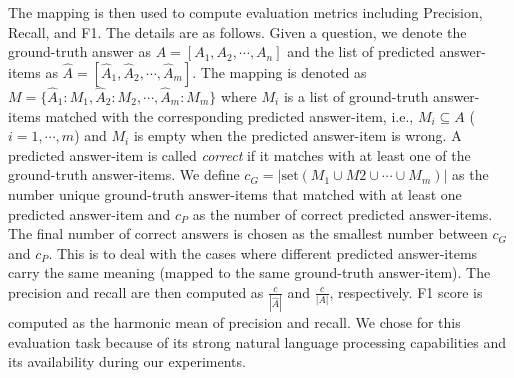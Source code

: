 The mapping is then used to compute evaluation metrics including Precision, Recall, and F1. The details are as follows. 
Given a question, we denote the ground-truth answer as $A=[A_1, A_2, \cdots, A_n]$ and the list of predicted answer-items as $\hat{A}=[\hat{A}_1, \hat{A}_2,\cdots, \hat{A}_m]$. The mapping is denoted as $M=\{\hat{A}_1: M_1, \hat{A}_2: M_2, \cdots, \hat{A}_m: M_m\}$ where $M_i$ is a list of ground-truth answer-items matched with the corresponding predicted answer-item, i.e., $M_i \subseteq A$ ($i=1, \cdots, m$) and $M_i$ is empty when the predicted answer-item is wrong. A predicted answer-item is called \textit{correct} if it matches with at least one of the ground-truth answer-items.
We define $c_G=|\text{set}(M_1\cup M2 \cup \cdots \cup M_m)|$ as the number unique ground-truth answer-items that matched with at least one predicted answer-item and $c_P$ as the number of correct predicted answer-items. The final number of correct answers is chosen as the smallest number between $c_G$ and $c_P$. 
This is to deal with the cases where different predicted answer-items carry the same meaning (mapped to the same ground-truth answer-item). The precision and recall are then computed as $\frac{c}{|\hat{A}|}$ and $\frac{c}{|A|}$, respectively. 
F1 score is computed as the harmonic mean of precision and recall. 
We chose \gemini for this evaluation task because of its strong natural language processing capabilities and its availability during our experiments.
